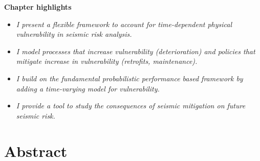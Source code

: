 \begin{small}




\clearpage
\vspace*{\fill}
\begingroup
\centering

\textbf{\Large{Chapter highlights}}

\hrulefill 

\begin{itemize}
\item \textsl{I present a flexible framework to account for time-dependent physical vulnerability in seismic risk analysis.}

\item \textsl{I model processes that increase vulnerability (deterioration) and policies that mitigate increase in vulnerability (retrofits, maintenance).}

\item \textsl{I build on the fundamental probabilistic performance based framework by adding a time-varying model for vulnerability.}

\item \textsl{I provide a tool to study the consequences of seismic mitigation on future seismic risk.}
\end{itemize}


\endgroup
\vspace*{\fill}



\end{small}
\clearpage

\section{Abstract}

